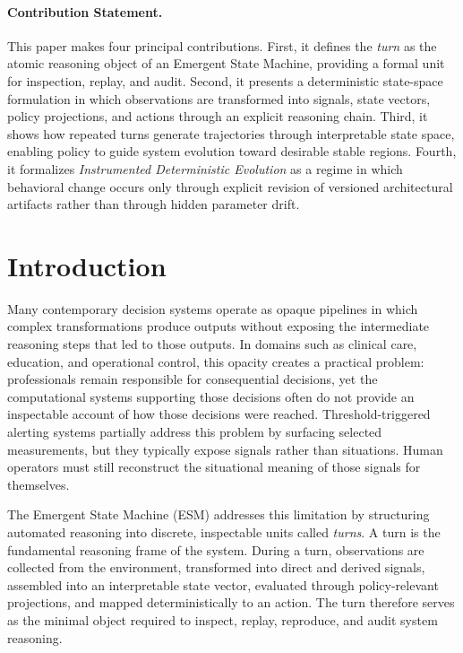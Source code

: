 \documentclass[11pt]{article}
\begin{document}
\paragraph{Contribution Statement.}
This paper makes four principal contributions. First, it defines the \emph{turn} as the atomic reasoning object of an Emergent State Machine, providing a formal unit for inspection, replay, and audit. Second, it presents a deterministic state-space formulation in which observations are transformed into signals, state vectors, policy projections, and actions through an explicit reasoning chain. Third, it shows how repeated turns generate trajectories through interpretable state space, enabling policy to guide system evolution toward desirable stable regions. Fourth, it formalizes \emph{Instrumented Deterministic Evolution} as a regime in which behavioral change occurs only through explicit revision of versioned architectural artifacts rather than through hidden parameter drift.



\section{Introduction}

Many contemporary decision systems operate as opaque pipelines in which complex transformations produce outputs without exposing the intermediate reasoning steps that led to those outputs. In domains such as clinical care, education, and operational control, this opacity creates a practical problem: professionals remain responsible for consequential decisions, yet the computational systems supporting those decisions often do not provide an inspectable account of how those decisions were reached. Threshold-triggered alerting systems partially address this problem by surfacing selected measurements, but they typically expose signals rather than situations. Human operators must still reconstruct the situational meaning of those signals for themselves.

The Emergent State Machine (ESM) addresses this limitation by structuring automated reasoning into discrete, inspectable units called \emph{turns}. A turn is the fundamental reasoning frame of the system. During a turn, observations are collected from the environment, transformed into direct and derived signals, assembled into an interpretable state vector, evaluated through policy-relevant projections, and mapped deterministically to an action. The turn therefore serves as the minimal object required to inspect, replay, reproduce, and audit system reasoning.
\end{document}
